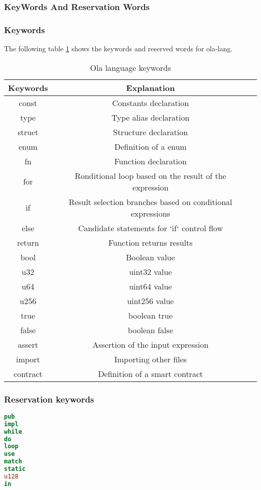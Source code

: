 \subsubsection{KeyWords And Reservation Words }

\subsubsection*{Keywords} 

The following table \ref{table: ola-lang-keywords} shows the keywords and reserved words for ola-lang.

\begin{table}[!ht]
\centering
\begin{tabular}{c|c|c}
\textbf{Keywords} & \textbf{Explanation} \\ \hline
const & Constants declaration \\
type & Type alias declaration \\
struct & Structure declaration \\
enum & Definition of a enum \\
fn & Function declaration \\
for & Ronditional loop based on the result of the expression \\
if & Result selection branches based on conditional expressions \\
else & Candidate statements for `if` control flow \\
return & Function returns results \\
bool & Boolean value \\
u32 & uint32 value \\
u64 & uint64 value \\
u256 & uint256 value \\
true & boolean true \\
false & boolean false \\
assert & Assertion of the input expression \\
import & Importing other files \\
contract & Definition of a smart contract \\
\end{tabular}
\caption{Ola language keywords}
\label{table: ola-lang-keywords}
\end{table}

\subsubsection*{Reservation keywords}

\begin{lstlisting}[language=Rust]
pub
impl
while
do
loop
use
match
static
u128
in
\end{lstlisting}
    